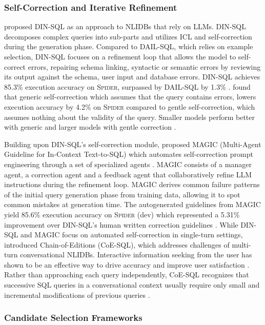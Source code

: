 \subsubsection{Self-Correction and Iterative Refinement}

\cite{DINSQL} proposed DIN-SQL as an approach to NLIDBs that rely on LLMs.
DIN-SQL decomposes complex queries into sub-parts and utilizes ICL and
self-correction during the generation phase. Compared to DAIL-SQL, which relies
on example selection, DIN-SQL focuses on a refinement loop that allows the
model to self-correct errors, repairing schema linking, syntactic or semantic
errors by reviewing its output against the schema, user input and database
errors. DIN-SQL achieves 85.3\% execution accuracy on \textsc{Spider},
surpassed by DAIL-SQL by 1.3\% \citep{DINSQL, DAIL-SQL}. \citeauthor{DINSQL}
found that generic self-correction which assumes that the query contains
errors, lowers execution accuracy by 4.2\% on \textsc{Spider} compared to
gentle self-correction, which assumes nothing about the validity of the query.
Smaller models perform better with generic and larger models with gentle
correction \citep{DINSQL}.

Building upon DIN-SQL's self-correction module, \cite{MAGIC} proposed MAGIC
(Multi-Agent Guideline for In-Context Text-to-SQL) which automates
self-correction prompt engineering through a set of specialized agents
\citep{MAGIC}. MAGIC consists of a manager agent, a correction agent and a
feedback agent that collaboratively refine LLM instructions during the
refinement loop. MAGIC derives common failure patterns of the initial query
generation phase from training data, allowing it to spot common mistakes at
generation time. The autogenerated guidelines from MAGIC yield 85.6\% execution
accuracy on \textsc{Spider} (dev) which represented a 5.31\% improvement over
DIN-SQL's human written correction guidelines \citep{MAGIC}. While DIN-SQL and
MAGIC focus on automated self-correction in single-turn settings,
\cite{CoE-SQL} introduced Chain-of-Editions (CoE-SQL), which addresses
challenges of multi-turn conversational NLIDBs. Interactive information seeking
from the user has shown to be an effective way to drive accuracy and improve
user satisfaction \citep{NALIR}. Rather than approaching each query
independently, CoE-SQL recognizes that successive SQL queries in a
conversational context usually require only small and incremental modifications
of previous queries \citep{CoE-SQL, UnnaturalQueryLanguage, NALIR}.

\subsubsection{Candidate Selection Frameworks}

